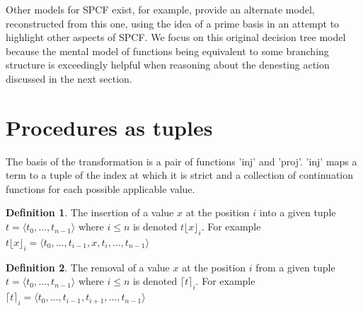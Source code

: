 \documentclass[12pt,a4paper]{report}
\theoremstyle{definition}
\theoremstyle{definition}
\newtheorem{definition}{Definition}[chapter]%
\theoremstyle{remark}
\begin{document}
Other models for SPCF exist, for example, \cite{kanneganti_1993} provide an alternate model, reconstructed from this one, using the idea of a prime basis \citep{Winskel1980EventsIC} in an attempt to highlight other aspects of SPCF. We focus on this original decision tree model because the mental model of functions being equivalent to some branching structure is exceedingly helpful when reasoning about the denesting action discussed in the next section.

\section{Procedures as tuples}\label{section:inj-proj}
The basis of the transformation is a pair of functions 'inj' and 'proj'. 'inj' maps a term to a tuple of the index at which it is strict and a collection of continuation functions for each possible applicable value. 

\begin{definition}
    The insertion of a value $x$ at the position $i$ into a given tuple $t = \langle t_0, \dots, t_{n-1} \rangle$ where $i \leq n$ is denoted $t\lfloor x \rfloor_i$. For example $t\lfloor x \rfloor_i = \langle t_0, \dots, t_{i-1}, x, t_i, \dots, t_{n-1} \rangle$
\end{definition}

\begin{definition}
    The removal of a value $x$ at the position $i$ from a given tuple $t = \langle t_0, \dots, t_{n-1} \rangle$ where $i \le n$ is denoted $\lceil t \rceil_i$. For example $\lceil t \rceil_i = \langle t_0, \dots, t_{i-1}, t_{i+1}, \dots, t_{n-1} \rangle$
\end{definition}
\end{document}
